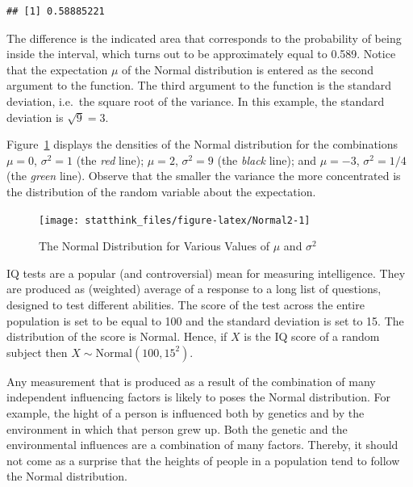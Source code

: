 \documentclass[]{krantz}
\theoremstyle{definition}
\theoremstyle{definition}
\theoremstyle{definition}
\theoremstyle{remark}
\let\BeginKnitrBlock\begin \let\EndKnitrBlock\end
\begin{document}
\begin{verbatim}
## [1] 0.58885221
\end{verbatim}

The difference is the indicated area that corresponds to the probability
of being inside the interval, which turns out to be approximately equal
to 0.589. Notice that the expectation \(\mu\) of the Normal distribution
is entered as the second argument to the function. The third argument to
the function is the standard deviation, i.e.~the square root of the
variance. In this example, the standard deviation is \(\sqrt{9}=3\).

Figure~\ref{fig:Normal2} displays the densities of the Normal
distribution for the combinations \(\mu= 0\), \(\sigma^2 = 1\) (the \emph{red}
line); \(\mu = 2\), \(\sigma^2 = 9\) (the \emph{black} line); and \(\mu = -3\),
\(\sigma^2 = 1/4\) (the \emph{green} line). Observe that the smaller the
variance the more concentrated is the distribution of the random
variable about the expectation.

\begin{figure}

{\centering \texttt{[image: statthink\_files/figure-latex/Normal2-1]} 

}

\caption{The Normal Distribution for Various Values of $\mu$ and $\sigma^2$}\label{fig:Normal2}
\end{figure}

\BeginKnitrBlock{example}
\protect\hypertarget{exm:exnormal1}{}{\label{exm:exnormal1} }IQ tests are a popular (and controversial) mean for
measuring intelligence. They are produced as (weighted) average of a
response to a long list of questions, designed to test different
abilities. The score of the test across the entire population is set to
be equal to 100 and the standard deviation is set to 15. The
distribution of the score is Normal. Hence, if \(X\) is the IQ score of a
random subject then \(X \sim \mathrm{Normal}(100,15^2)\).
\EndKnitrBlock{example}

\BeginKnitrBlock{example}
\protect\hypertarget{exm:exnormal2}{}{\label{exm:exnormal2} }Any measurement that is produced as a result of the
combination of many independent influencing factors is likely to poses
the Normal distribution. For example, the hight of a person is
influenced both by genetics and by the environment in which that person
grew up. Both the genetic and the environmental influences are a
combination of many factors. Thereby, it should not come as a surprise
that the heights of people in a population tend to follow the Normal
distribution.
\EndKnitrBlock{example}
\end{document}
